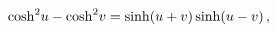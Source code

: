 \[{\mathop{\cosh\/}\nolimits^{2}}u-{\mathop{\cosh\/}\nolimits^{2}}v=\mathop{%
\sinh\/}\nolimits\!\left(u+v\right)\mathop{\sinh\/}\nolimits\!\left(u-v\right),\]